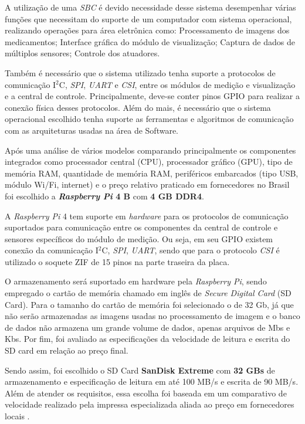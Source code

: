     A utilização de uma \textit{SBC} é devido necessidade desse sistema desempenhar várias funções que necessitam do suporte de um computador com sistema operacional, realizando  operações para área eletrônica como: Processamento de imagens dos medicamentos; Interface gráfica do módulo de visualização; Captura de dados de múltiplos sensores; Controle dos atuadores.
    
    Também é necessário que o sistema utilizado tenha suporte a protocolos de comunicação I$^2$C, \textit{SPI}, \textit{UART} e \textit{CSI}, entre os módulos de medição e visualização e a central de controle. Principalmente, deve-se conter pinos GPIO para realizar a conexão física desses protocolos. Além do mais, é necessário que o sistema operacional escolhido tenha suporte as ferramentas e algoritmos de comunicação com as arquiteturas usadas na área de Software.
    
    Após uma análise de vários modelos comparando principalmente os componentes integrados como processador central (CPU), processador gráfico (GPU), tipo de memória RAM, quantidade de memória RAM, periféricos embarcados (tipo USB, módulo Wi/Fi, internet) e o preço relativo praticado em fornecedores no Brasil foi escolhido a \textbf{\textit{Raspberry Pi }4 B} com \textbf{4 GB DDR4}. 
    
    A \textit{Raspberry Pi} 4 tem suporte em \textit{hardware} para os protocolos de comunicação suportados para comunicação entre os componentes da central de controle e sensores específicos do módulo de medição. Ou seja, em seu GPIO existem conexão da comunicação I$^2$C, \textit{SPI}, \textit{UART}, sendo que para o protocolo \textit{CSI} é utilizado o soquete ZIF de 15 pinos na parte traseira da placa. 
    
    O armazenamento será suportado em hardware pela \textit{Raspberry Pi}, sendo empregado o cartão de memória chamado em inglês de \textit{Secure Digital Card} (SD Card). Para o tamanho do cartão de memória foi selecionado o de 32 Gb, já que não serão  armazenadas as imagens usadas no processamento de imagem e o banco de dados não armazena um grande volume de dados, apenas arquivos de Mbs e Kbs. Por fim, foi avaliado as especificações da velocidade de leitura e escrita do SD card em relação ao preço final. 
    
    Sendo assim, foi escolhido o SD Card \textbf{SanDisk Extreme} com \textbf{32 GBs} de armazenamento e especificação de leitura em até 100 MB/s e escrita de 90 MB/s. Além de atender os requisitos, essa escolha foi baseada em um comparativo de velocidade realizado pela impressa especializada aliada ao preço em fornecedores locais \cite{sdcard_benchmark}. 
    
